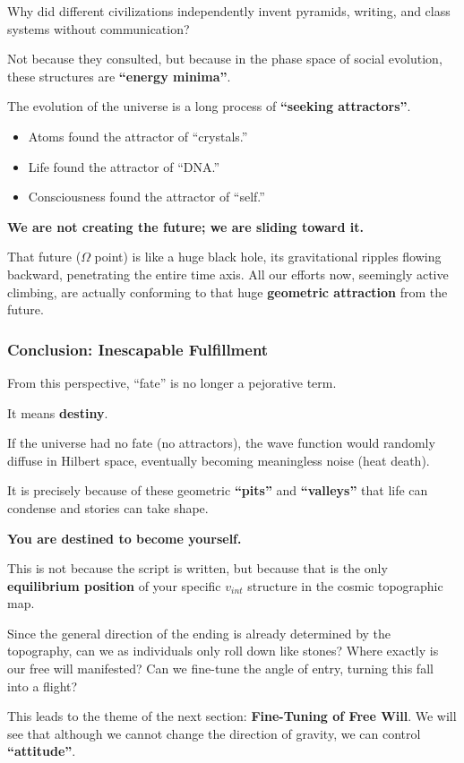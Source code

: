 Why did different civilizations independently invent pyramids, writing, and class systems without communication?

Not because they consulted, but because in the phase space of social evolution, these structures are \textbf{``energy minima''}.

The evolution of the universe is a long process of \textbf{``seeking attractors''}.

\begin{itemize}
\item Atoms found the attractor of ``crystals.''

\item Life found the attractor of ``DNA.''

\item Consciousness found the attractor of ``self.''
\end{itemize}

\textbf{We are not creating the future; we are sliding toward it.}

That future ($\Omega$ point) is like a huge black hole, its gravitational ripples flowing backward, penetrating the entire time axis. All our efforts now, seemingly active climbing, are actually conforming to that huge \textbf{geometric attraction} from the future.

\subsubsection{Conclusion: Inescapable Fulfillment}

From this perspective, ``fate'' is no longer a pejorative term.

It means \textbf{destiny}.

If the universe had no fate (no attractors), the wave function would randomly diffuse in Hilbert space, eventually becoming meaningless noise (heat death).

It is precisely because of these geometric \textbf{``pits''} and \textbf{``valleys''} that life can condense and stories can take shape.

\textbf{You are destined to become yourself.}

This is not because the script is written, but because that is the only \textbf{equilibrium position} of your specific $v_{int}$ structure in the cosmic topographic map.

Since the general direction of the ending is already determined by the topography, can we as individuals only roll down like stones? Where exactly is our free will manifested? Can we fine-tune the angle of entry, turning this fall into a flight?

This leads to the theme of the next section: \textbf{Fine-Tuning of Free Will}. We will see that although we cannot change the direction of gravity, we can control \textbf{``attitude''}.

